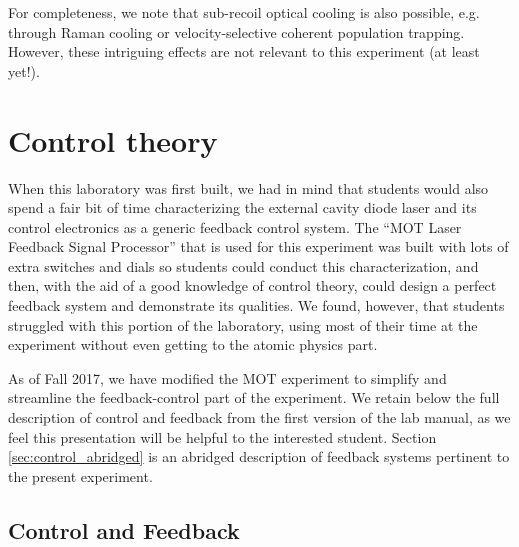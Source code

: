 \documentclass{../lab}
\begin{document}
For completeness, we note that sub-recoil optical cooling is also possible, e.g. through Raman cooling or velocity-selective coherent population trapping. However, these intriguing effects are not relevant to this experiment (at least yet!).


\section{Control theory}
\label{sec:controlappendix}

When this laboratory was first built, we had in mind that students would also spend a fair bit of time characterizing the external cavity diode laser and its control electronics as a generic feedback control system.  The ``MOT Laser Feedback Signal Processor'' that is used for this experiment was built with lots of extra switches and dials so students could conduct this characterization, and then, with the aid of a good knowledge of control theory, could design a perfect feedback system and demonstrate its qualities.  We found, however, that students struggled with this portion of the laboratory, using most of their time at the experiment without even getting to the atomic physics part.

As of Fall 2017, we have modified the MOT experiment to simplify and streamline the feedback-control part of the experiment.  We retain below the full description of control and feedback from the first version of the lab manual, as we feel this presentation will be helpful to the interested student.  Section \ref{sec:control_abridged} is an abridged description of feedback systems pertinent to the present experiment.

\subsection{Control and Feedback}
\end{document}
